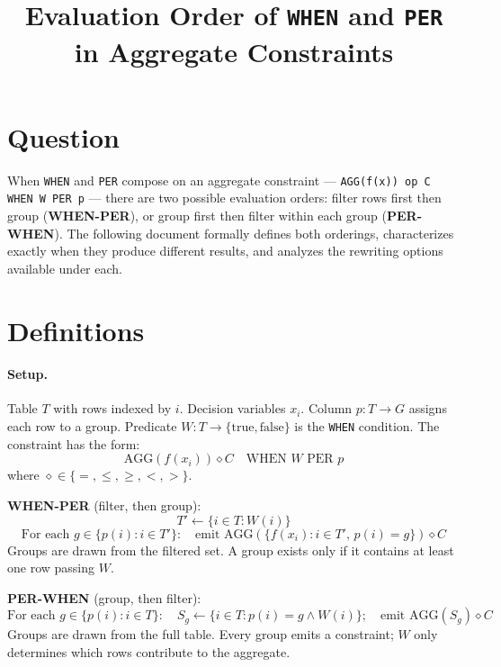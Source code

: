 \documentclass[11pt]{article}
\title{Evaluation Order of \texttt{WHEN} and \texttt{PER} \\ in Aggregate Constraints}
\author{}
\date{}
\begin{document}
\maketitle

\section{Question}

When \texttt{WHEN} and \texttt{PER} compose on an aggregate constraint ---
\texttt{AGG(f(x)) op C WHEN W PER p} --- there are two possible evaluation
orders: filter rows first then group (\textbf{WHEN-PER}), or group first then
filter within each group (\textbf{PER-WHEN}). The following document formally
defines both orderings, characterizes exactly when they produce different
results, and analyzes the rewriting options available under each.

\section{Definitions}

\paragraph{Setup.} Table $T$ with rows indexed by $i$. Decision variables
$x_i$. Column $p : T \to G$ assigns each row to a group. Predicate
$W : T \to \{\text{true}, \text{false}\}$ is the \texttt{WHEN} condition. The
constraint has the form:
\[
\text{AGG}(f(x_i)) \diamond C \quad \text{WHEN } W \text{ PER } p
\]
where $\diamond \in \{=, \leq, \geq, <, >\}$.

\bigskip

\noindent\textbf{WHEN-PER} (filter, then group):
\[
T' \leftarrow \{i \in T : W(i)\}
\]
\[
\text{For each } g \in \{p(i) : i \in T'\}: \quad
\text{emit } \text{AGG}(\{f(x_i) : i \in T',\, p(i) = g\}) \diamond C
\]
Groups are drawn from the filtered set. A group exists only if it contains at
least one row passing $W$.

\medskip

\noindent\textbf{PER-WHEN} (group, then filter):
\[
\text{For each } g \in \{p(i) : i \in T\}: \quad
S_g \leftarrow \{i \in T : p(i) = g \wedge W(i)\}; \quad
\text{emit } \text{AGG}(S_g) \diamond C
\]
Groups are drawn from the full table. Every group emits a constraint; $W$ only
determines which rows contribute to the aggregate.

\bigskip
\end{document}
